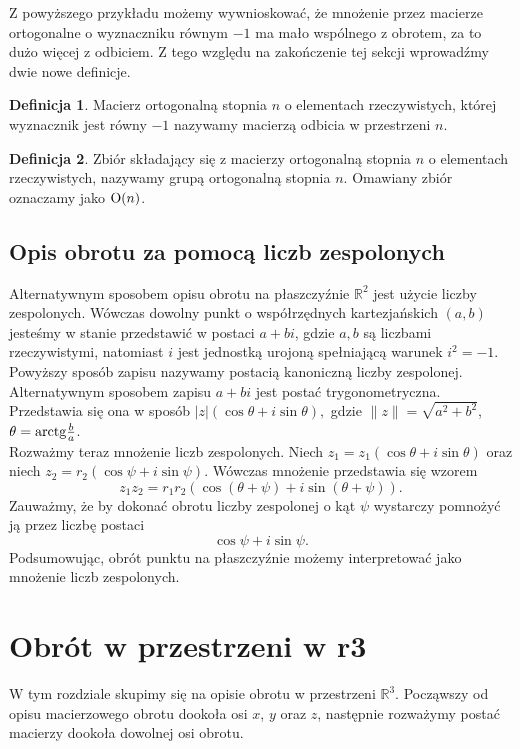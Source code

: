 \documentclass[a4paper,twoside,11pt,reqno]{mwrep}
\theoremstyle{plain} \newtheorem{twr}{Twierdzenie}
\theoremstyle{plain} \newtheorem{lem}{Lemat}
\theoremstyle{definition} \newtheorem{defi}{Definicja}
\theoremstyle{remark} \newtheorem*{wni}{Wniosek}
\theoremstyle{definition} \newtheorem{uwaga}{Uwaga}
\theoremstyle{definition}\newtheorem{prz}{Przykład}
\begin{document}
Z powyższego przykładu możemy wywnioskować, że mnożenie przez macierze ortogonalne 
o wyznaczniku równym $-1$ ma mało wspólnego z obrotem, za to dużo więcej z odbiciem. Z tego 
względu na zakończenie tej sekcji wprowadźmy dwie nowe definicje. 
\begin{defi}
Macierz ortogonalną stopnia $n$ o elementach rzeczywistych, której wyznacznik jest równy $-1$ 
nazywamy macierzą odbicia w przestrzeni $n$. 
\end{defi}
\begin{defi}
Zbiór składający się z macierzy ortogonalną stopnia $n$ o elementach rzeczywistych, nazywamy grupą
ortogonalną stopnia $n$. Omawiany zbiór oznaczamy jako $\textup{O}(n)$.
\end{defi}


\subsection{Opis obrotu za pomocą liczb zespolonych}
Alternatywnym sposobem opisu obrotu na płaszczyźnie $\mathbb{R}^2$
jest użycie liczby zespolonych. Wówczas dowolny punkt o współrzędnych kartezjańskich $(a,b)$
jesteśmy w stanie przedstawić w postaci $a+bi$, gdzie $a,b$ są liczbami rzeczywistymi, natomiast 
$i$ jest jednostką urojoną spełniającą warunek $i^2 = -1$. Powyższy sposób zapisu nazywamy 
postacią kanoniczną liczby zespolonej.\\
Alternatywnym sposobem zapisu $a+bi$ jest postać trygonometryczna. Przedstawia się ona w sposób
$|z|(\cos\theta+i\sin\theta),$
gdzie $\|z\| =\sqrt{a^2+b^2}$, $\theta=\textup{arctg}\frac{b}{a}$.\\

Rozważmy teraz mnożenie liczb zespolonych. Niech $z_1 = z_1(\cos\theta +i\sin\theta)$ oraz 
niech $z_2 = r_2(\cos\psi +i\sin\psi)$.
Wówczas mnożenie przedstawia się wzorem
$$z_1z_2=r_1r_2(\cos(\theta+\psi) +i\sin(\theta+\psi)).$$
Zauważmy, że by dokonać obrotu liczby zespolonej o kąt $\psi$ 
wystarczy pomnożyć ją przez liczbę postaci $$\cos\psi +i\sin\psi.$$
Podsumowując, obrót punktu na płaszczyźnie możemy interpretować jako mnożenie liczb zespolonych.

\section{Obrót w przestrzeni w r3}

W tym rozdziale skupimy się na opisie obrotu w
przestrzeni $\mathbb{R}^3$. 
Począwszy od opisu macierzowego obrotu dookoła osi $x$, $y$ oraz $z$, następnie
rozważymy postać macierzy dookoła dowolnej osi obrotu.
\end{document}
